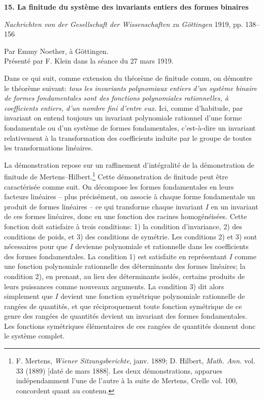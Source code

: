 \begin{center}
{\Large\bfseries 15. La finitude du système des invariants entiers des formes binaires}\par
\vspace{1em}
\emph{Nachrichten von der Gesellschaft der Wissenschaften zu Göttingen} 1919, pp. 138--156
\end{center}

\vspace{2em}
\begin{center}
Par Emmy Noether, à Göttingen.\\[1em]
Présenté par F. Klein dans la séance du 27 mars 1919.
\end{center}

Dans ce qui suit, comme extension du théorème de finitude connu, on démontre le théorème suivant: \emph{tous les invariants polynomiaux entiers d'un système binaire de formes fondamentales sont des fonctions polynomiales rationnelles, à coefficients entiers, d'un nombre fini d'entre eux.} Ici, comme d'habitude, par \og invariant \fg{} on entend toujours un invariant polynomiale rationnel d'une forme fondamentale ou d'un système de formes fondamentales, c'est-à-dire un invariant relativement à la transformation des coefficients induite par le groupe de toutes les transformations linéaires.

La démonstration repose sur un raffinement d'intégralité de la démonstration de finitude de Mertens--Hilbert.\footnote{F. Mertens, \emph{Wiener Sitzungsberichte}, janv. 1889; D. Hilbert, \emph{Math. Ann.} vol. 33 (1889) [daté de mars 1888]. Les deux démonstrations, apparues indépendamment l'une de l'autre à la suite de Mertens, Crelle vol. 100, concordent quant au contenu.} Cette démonstration de finitude peut être caractérisée comme suit. On décompose les formes fondamentales en leurs facteurs linéaires -- plus précisément, on associe à chaque forme fondamentale un produit de formes linéaires -- ce qui transforme chaque invariant $I$ en un invariant de ces formes linéaires, donc en une fonction des racines homogénéisées. Cette fonction doit satisfaire à trois conditions: 1) la condition d'invariance, 2) des conditions de poids, et 3) des conditions de symétrie. Les conditions 2) et 3) sont nécessaires pour que $I$ devienne polynomiale et rationnelle dans les coefficients des formes fondamentales. La condition 1) est satisfaite en représentant $I$ comme une fonction polynomiale rationnelle des déterminants des formes linéaires; la condition 2), en prenant, au lieu des déterminants isolés, certains produits de leurs puissances comme nouveaux arguments. La condition 3) dit alors simplement que $I$ devient une fonction symétrique polynomiale rationnelle de rangées de quantités, et que réciproquement toute fonction symétrique de ce genre des rangées de quantités devient un invariant des formes fondamentales. Les fonctions symétriques élémentaires de ces rangées de quantités donnent donc le système complet.

